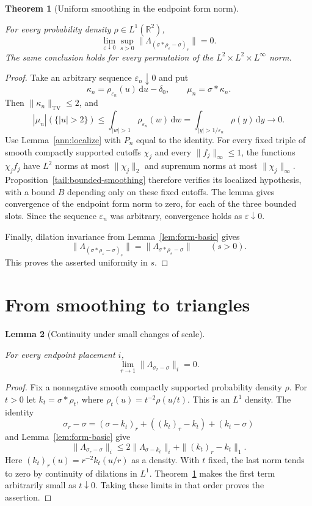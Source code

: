 \documentclass[11pt]{amsart}
\newcommand{\R}{\mathbb R}
\newcommand{\dd}{\,\mathrm d}
\newtheorem{theorem}{Theorem}[section]
\newtheorem{lemma}[theorem]{Lemma}
\theoremstyle{definition}
\theoremstyle{remark}
\numberwithin{equation}{section}
\providecommand{\lean}[1]{}
\providecommand{\leanok}{}
\begin{document}
\begin{theorem}[Uniform smoothing in the endpoint form norm]
\label{tail:smoothing}
\lean{Auto.tail_smoothing}
\leanok
For every probability density $\rho\in L^1(\R^2)$,
\[
 \lim_{\varepsilon\downarrow0}\sup_{s>0}
      \|\Lambda_{(\sigma*\rho_\varepsilon-\sigma)_s}\|=0.
\]
The same conclusion holds for every permutation of the
$L^2\times L^2\times L^\infty$ norm.
\end{theorem}
\begin{proof}
Take an arbitrary sequence $\varepsilon_n\downarrow0$ and put
\[
 \kappa_n=\rho_{\varepsilon_n}(u)\dd u-\delta_0,
 \qquad \mu_n=\sigma*\kappa_n.
\]
Then $\|\kappa_n\|_{\mathrm{TV}}\le2$, and
\[
 |\mu_n|(\{|u|>2\})
   \le\int_{|w|>1}\rho_{\varepsilon_n}(w)\dd w
   =\int_{|y|>1/\varepsilon_n}\rho(y)\dd y\longrightarrow0.
\]
Use Lemma~\ref{ann:localize} with $P_n$ equal to the identity.
For every fixed triple of smooth compactly supported cutoffs $\chi_j$
and every $\|f_j\|_\infty\le1$, the functions $\chi_jf_j$ have
$L^2$ norms at most $\|\chi_j\|_2$ and supremum norms at most
$\|\chi_j\|_\infty$. Proposition~\ref{tail:bounded-smoothing}
therefore verifies its localized hypothesis, with a bound $B$ depending
only on these fixed cutoffs. The lemma gives convergence of the
endpoint form norm to zero, for each of the three bounded slots.
Since the sequence $\varepsilon_n$ was arbitrary, convergence holds
as $\varepsilon\downarrow0$.

Finally, dilation invariance from Lemma~\ref{lem:form-basic} gives
\[
 \|\Lambda_{(\sigma*\rho_\varepsilon-\sigma)_s}\|
       =\|\Lambda_{\sigma*\rho_\varepsilon-\sigma}\|
       \qquad(s>0).
\]
This proves the asserted uniformity in $s$.
\end{proof}



\section{From smoothing to triangles}\label{sec:density}

\begin{lemma}[Continuity under small changes of scale]\label{den:continuity}
\lean{Auto.den_continuity}
\leanok
For every endpoint placement $i$,
\[
 \lim_{r\to1}\|\Lambda_{\sigma_r-\sigma}\|_i=0.
\]
\end{lemma}
\begin{proof}
Fix a nonnegative smooth compactly supported probability density
$\rho$.  For $t>0$ let $k_t=\sigma*\rho_t$, where
$\rho_t(u)=t^{-2}\rho(u/t)$.  This is an $L^1$ density.
The identity
\[
 \sigma_r-\sigma=(\sigma-k_t)_r+((k_t)_r-k_t)+(k_t-\sigma)
\]
and Lemma~\ref{lem:form-basic} give
\[
 \|\Lambda_{\sigma_r-\sigma}\|_i
 \le2\|\Lambda_{\sigma-k_t}\|_i+\|(k_t)_r-k_t\|_1.
\]
Here $(k_t)_r(u)=r^{-2}k_t(u/r)$ as a density.  With $t$ fixed,
the last norm tends to zero by continuity of dilations in $L^1$.
Theorem~\ref{tail:smoothing} makes the first term arbitrarily
small as $t\downarrow0$.  Taking these limits in that order
proves the assertion.
\end{proof}
\end{document}
